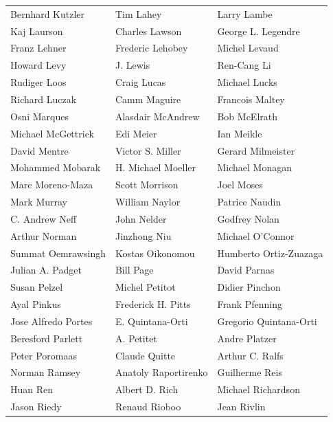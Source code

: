 \vfill
\newpage
\begin{tabular}{lll}
Bernhard Kutzler       & Tim Lahey              & Larry Lambe\\
Kaj Laurson            & Charles Lawson         & George L. Legendre\\
Franz Lehner           & Frederic Lehobey       & Michel Levaud\\
Howard Levy            & J. Lewis               & Ren-Cang Li\\
Rudiger Loos           & Craig Lucas            & Michael Lucks\\
Richard Luczak         & Camm Maguire           & Francois Maltey\\
Osni Marques           & Alasdair McAndrew      & Bob McElrath\\
Michael McGettrick     & Edi Meier              & Ian Meikle\\
David Mentre           & Victor S. Miller       & Gerard Milmeister\\
Mohammed Mobarak       & H. Michael Moeller     & Michael Monagan\\
Marc Moreno-Maza       & Scott Morrison         & Joel Moses\\
Mark Murray            & William Naylor         & Patrice Naudin\\
C. Andrew Neff         & John Nelder            & Godfrey Nolan\\
Arthur Norman          & Jinzhong Niu           & Michael O'Connor\\
Summat Oemrawsingh     & Kostas Oikonomou       & Humberto Ortiz-Zuazaga\\
Julian A. Padget       & Bill Page              & David Parnas\\
Susan Pelzel           & Michel Petitot         & Didier Pinchon\\
Ayal Pinkus            & Frederick H. Pitts     & Frank Pfenning\\
Jose Alfredo Portes    & E. Quintana-Orti       & Gregorio Quintana-Orti\\
Beresford Parlett      & A. Petitet             & Andre Platzer\\
Peter Poromaas         & Claude Quitte          & Arthur C. Ralfs\\
Norman Ramsey          & Anatoly Raportirenko   & Guilherme Reis\\
Huan Ren               & Albert D. Rich         & Michael Richardson\\
Jason Riedy            & Renaud Rioboo          & Jean Rivlin\\

\end{tabular}
